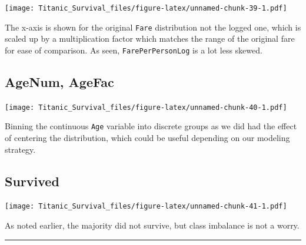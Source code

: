 \documentclass[]{article}
\begin{document}
\texttt{[image: Titanic\_Survival\_files/figure-latex/unnamed-chunk-39-1.pdf]}

The x-axis is shown for the original \texttt{Fare} distribution not the
logged one, which is scaled up by a multiplication factor which matches
the range of the original fare for ease of comparison. As seen,
\texttt{FarePerPersonLog} is a lot less skewed.

\subsection{AgeNum, AgeFac}\label{agenum-agefac}

\texttt{[image: Titanic\_Survival\_files/figure-latex/unnamed-chunk-40-1.pdf]}

Binning the continuous \texttt{Age} variable into discrete groups as we
did had the effect of centering the distribution, which could be useful
depending on our modeling strategy.

\subsection{Survived}\label{survived-1}

\texttt{[image: Titanic\_Survival\_files/figure-latex/unnamed-chunk-41-1.pdf]}

As noted earlier, the majority did not survive, but class imbalance is
not a worry.

\begin{center}\rule{0.5\linewidth}{\linethickness}\end{center}
\end{document}
